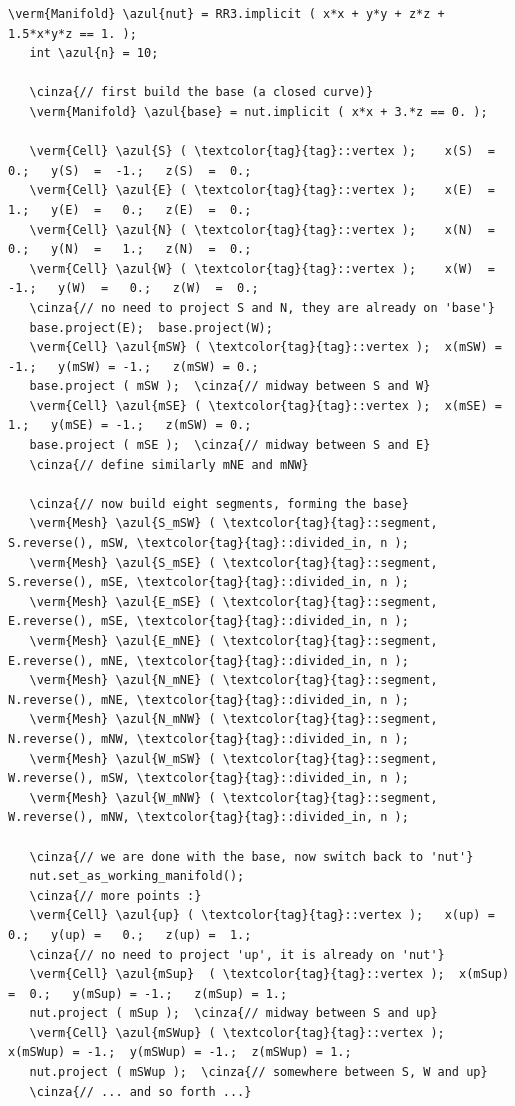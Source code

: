 \begin{Verbatim}[commandchars=\\\{\},formatcom=\small\tt,frame=single,
   label=parag-\ref{\numb section 2.\numb parag 13}.cpp,rulecolor=\color{coment},
   baselinestretch=0.94,framesep=2mm]
   \verm{Manifold} \azul{nut} = RR3.implicit ( x*x + y*y + z*z + 1.5*x*y*z == 1. );
   int \azul{n} = 10;

   \cinza{// first build the base (a closed curve)}
   \verm{Manifold} \azul{base} = nut.implicit ( x*x + 3.*z == 0. );

   \verm{Cell} \azul{S} ( \textcolor{tag}{tag}::vertex );    x(S)  =   0.;   y(S)  =  -1.;   z(S)  =  0.;
   \verm{Cell} \azul{E} ( \textcolor{tag}{tag}::vertex );    x(E)  =   1.;   y(E)  =   0.;   z(E)  =  0.;
   \verm{Cell} \azul{N} ( \textcolor{tag}{tag}::vertex );    x(N)  =   0.;   y(N)  =   1.;   z(N)  =  0.;
   \verm{Cell} \azul{W} ( \textcolor{tag}{tag}::vertex );    x(W)  =  -1.;   y(W)  =   0.;   z(W)  =  0.;
   \cinza{// no need to project S and N, they are already on 'base'}
   base.project(E);  base.project(W);
   \verm{Cell} \azul{mSW} ( \textcolor{tag}{tag}::vertex );  x(mSW) = -1.;   y(mSW) = -1.;   z(mSW) = 0.;
   base.project ( mSW );  \cinza{// midway between S and W}
   \verm{Cell} \azul{mSE} ( \textcolor{tag}{tag}::vertex );  x(mSE) =  1.;   y(mSE) = -1.;   z(mSW) = 0.;
   base.project ( mSE );  \cinza{// midway between S and E}
   \cinza{// define similarly mNE and mNW}

   \cinza{// now build eight segments, forming the base}
   \verm{Mesh} \azul{S_mSW} ( \textcolor{tag}{tag}::segment, S.reverse(), mSW, \textcolor{tag}{tag}::divided_in, n );
   \verm{Mesh} \azul{S_mSE} ( \textcolor{tag}{tag}::segment, S.reverse(), mSE, \textcolor{tag}{tag}::divided_in, n );
   \verm{Mesh} \azul{E_mSE} ( \textcolor{tag}{tag}::segment, E.reverse(), mSE, \textcolor{tag}{tag}::divided_in, n );
   \verm{Mesh} \azul{E_mNE} ( \textcolor{tag}{tag}::segment, E.reverse(), mNE, \textcolor{tag}{tag}::divided_in, n );
   \verm{Mesh} \azul{N_mNE} ( \textcolor{tag}{tag}::segment, N.reverse(), mNE, \textcolor{tag}{tag}::divided_in, n );
   \verm{Mesh} \azul{N_mNW} ( \textcolor{tag}{tag}::segment, N.reverse(), mNW, \textcolor{tag}{tag}::divided_in, n );
   \verm{Mesh} \azul{W_mSW} ( \textcolor{tag}{tag}::segment, W.reverse(), mSW, \textcolor{tag}{tag}::divided_in, n );
   \verm{Mesh} \azul{W_mNW} ( \textcolor{tag}{tag}::segment, W.reverse(), mNW, \textcolor{tag}{tag}::divided_in, n );

   \cinza{// we are done with the base, now switch back to 'nut'}
   nut.set_as_working_manifold();
   \cinza{// more points :}
   \verm{Cell} \azul{up} ( \textcolor{tag}{tag}::vertex );   x(up) =   0.;   y(up) =   0.;   z(up) =  1.;
   \cinza{// no need to project 'up', it is already on 'nut'}
   \verm{Cell} \azul{mSup}  ( \textcolor{tag}{tag}::vertex );  x(mSup) =  0.;   y(mSup) = -1.;   z(mSup) = 1.;
   nut.project ( mSup );  \cinza{// midway between S and up}
   \verm{Cell} \azul{mSWup} ( \textcolor{tag}{tag}::vertex );  x(mSWup) = -1.;  y(mSWup) = -1.;  z(mSWup) = 1.;
   nut.project ( mSWup );  \cinza{// somewhere between S, W and up}
   \cinza{// ... and so forth ...}


\end{Verbatim}

